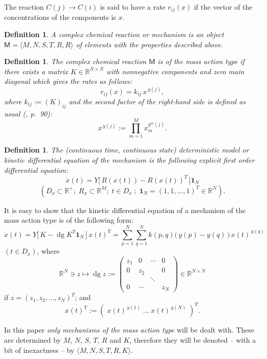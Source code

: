\documentclass[12pt,a4paper]{article}
\newtheorem{definition}[theorem]{Definition}
\newcommand{\R}{\mathbb{R}}
\begin{document}
The reaction $C(j) \to C(i)$ is said to have a rate $r_{ij}(x)$ if the vector of the concentrations of the components is $x$.

\begin{definition}
A \emph{complex chemical reaction} or \emph{mechanism} is an object $\mathsf{M} = \langle M, N, S, T, R, R \rangle$ of elements with the properties described above.
\end{definition}

\begin{definition}
The complex chemical reaction $\mathsf{M}$ is of the \emph{mass action type} if there exists a matrix $K \in \R^{N \times N}$ with nonnegative components and zero main diagonal which gives the rates as follows:
\[
  r_{ij}(x) = k_{ij}\, x^{\,y(j)},
\]
where $k_{ij} := (K)_{ij}$ and the second factor of the right-hand side is defined as usual (\cite{HornJackson1972}, p.~90):
\[
  x^{\,y(j)} := \prod_{m=1}^{M} x_m^{y^m(j)}.
\]
\end{definition}

\begin{definition}
The (continuous time, continuous state) \emph{deterministic model} or \emph{kinetic differential equation} of the mechanism is the following explicit first order differential equation:
\[
  \dot{x}(t) = Y\bigl[\, R(x(t)) - R(x(t))^T\,\bigr] \mathbf{1}_N
\]
\[
  (D_x \subset \R^+;\; R_x \subset \R^M;\; t \in D_x \;;\; \mathbf{1}_N = (1,1,\ldots,1)^T \in \R^N).
\]
\end{definition}

It is easy to show that the kinetic differential equation of a mechanism of the mass action type is of the following form:
\begin{equation}\label{eq:kde}
  \dot{x}(t) = Y\bigl[\,K - \operatorname{dg} K^T \mathbf{1}_N\,\bigr]\, x(t)^Y
  = \sum_{p=1}^{N} \sum_{q=1}^{N} k(p,q)\bigl(\,y(p) - y(q)\,\bigr)\, x(t)^{\,y(q)}
\end{equation}
$(t \in D_x)$, where
\[
  \R^N \ni z \mapsto \operatorname{dg} z :=
  \begin{pmatrix}
    z_1 & 0 & \cdots & 0 \\
    0 & z_2 &        & 0 \\
      &     & \ddots &   \\
    0 & \cdots &      & z_N
  \end{pmatrix}
  \in \R^{N \times N}
\]
if $z = (z_1, z_2, \ldots, z_N)^T$;\; and
\[
  x(t)^Y := (\; x(t)^{\,y(1)} \;\ldots\; x(t)^{\,y(N)}\;)^T.
\]

In this paper \emph{only mechanisms of the mass action type} will be dealt with.  These are determined by $M$, $N$, $S$, $T$, $R$ and $K$, therefore they will be denoted -- with a bit of inexactness -- by $\langle M, N, S, T, R, K \rangle$.
\end{document}
